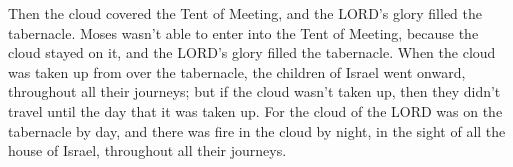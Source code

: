 \myverse{}Then the cloud covered the Tent of Meeting, and the LORD’s glory
filled the tabernacle.
\myverse{}Moses wasn’t able to enter into the Tent of Meeting, because the cloud stayed
on it, and the LORD’s glory filled the tabernacle.
\myverse{}When the cloud was taken up from over the tabernacle, the children of Israel
went onward, throughout all their journeys;
\myverse{}but if the cloud wasn’t taken up, then they didn’t travel until the day that
it was taken up.
\myverse{}For the cloud of the LORD was on the tabernacle by day, and there was fire
in the cloud by night, in the sight of all the house of Israel, throughout all their journeys.


